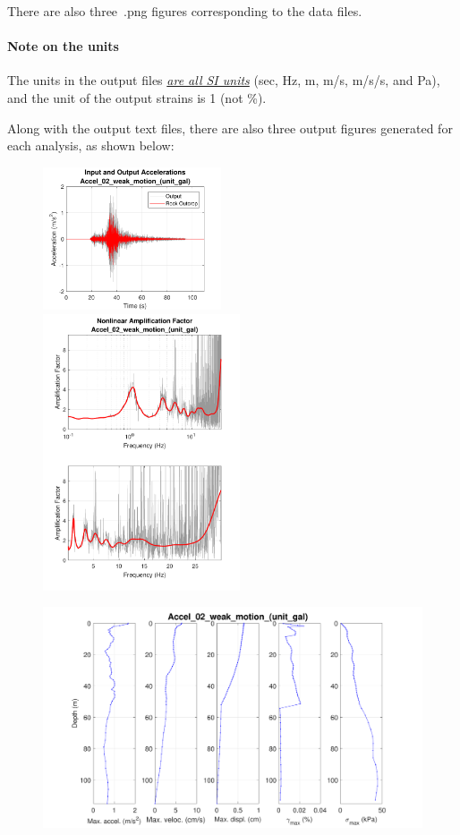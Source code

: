 \documentclass[11pt,letterpaper]{article}
\begin{document}
There are also three~\textsf{.png} figures corresponding to the data files.

\paragraph{Note on the units} The units in the output files \emph{\underline{are all SI units}} (sec, Hz, m, m/s, m/s/s, and Pa), and the unit of the output strains is 1 (not \%).

Along with the output text files, there are also three output figures generated for each analysis, as shown below:

\begin{figure}[H]
    \includegraphics[width=0.47\textwidth]{Accel_02_weak_motion_(unit_gal)_accelerations.pdf}
    \includegraphics[width=0.52\textwidth]{Accel_02_weak_motion_(unit_gal)_nonlinear_TF.pdf}
\end{figure}

\begin{figure}[H]
    \includegraphics[width=\textwidth]{Accel_02_weak_motion_(unit_gal)_max_a_v_d_gamma_tau.pdf}
\end{figure}
\end{document}
